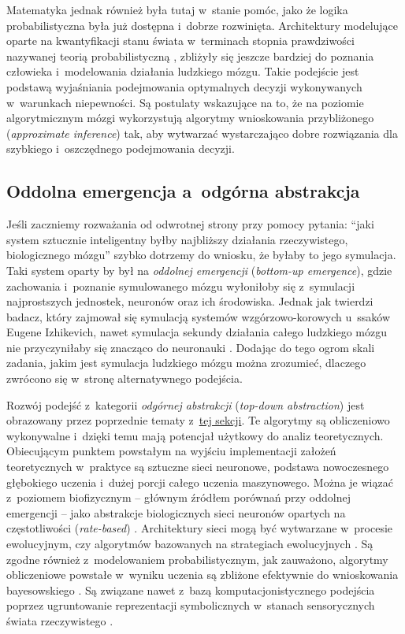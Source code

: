 Matematyka jednak również była tutaj w~stanie pomóc, jako że logika probabilistyczna była już dostępna i~dobrze rozwinięta.
Architektury modelujące oparte na kwantyfikacji stanu świata w~terminach stopnia prawdziwości nazywanej teorią probabilistyczną \cite{jaynes1988does}, zbliżyły się jeszcze bardziej do poznania człowieka i~modelowania działania ludzkiego mózgu.
Takie podejście jest podstawą wyjaśniania podejmowania optymalnych decyzji wykonywanych w~warunkach niepewności.
Są postulaty wskazujące na to, że na poziomie algorytmicznym mózgi wykorzystują algorytmy wnioskowania przybliżonego (\emph{approximate inference}) \cite{andrieu2003introduction} tak, aby wytwarzać wystarczająco dobre rozwiązania dla szybkiego i~oszczędnego podejmowania decyzji.

\subsection{Oddolna emergencja a~odgórna abstrakcja}

Jeśli zaczniemy rozważania od odwrotnej strony przy pomocy pytania: ``jaki system sztucznie inteligentny byłby najbliższy działania rzeczywistego, biologicznego mózgu'' szybko dotrzemy do wniosku, że byłaby to jego symulacja.
Taki system oparty by był na \emph{oddolnej emergencji} (\emph{bottom-up emergence}), gdzie zachowania i~poznanie symulowanego mózgu wyłoniłoby się z~symulacji najprostszych jednostek, neuronów oraz ich środowiska.
Jednak jak twierdzi badacz, który zajmował się symulacją systemów wzgórzowo-korowych u~ssaków \cite{izhikevich2008large} Eugene Izhikevich, nawet symulacja sekundy działania całego ludzkiego mózgu nie przyczyniłaby się znacząco do neuronauki \cite{Izhikevich2006why}.
Dodając do tego ogrom skali zadania, jakim jest symulacja ludzkiego mózgu można zrozumieć, dlaczego zwrócono się w~stronę alternatywnego podejścia.

Rozwój podejść z~kategorii \emph{odgórnej abstrakcji} (\emph{top-down abstraction}) jest obrazowany przez poprzednie tematy z~\hyperref[cognitive-basics]{tej sekcji}.
Te algorytmy są obliczeniowo wykonywalne i~dzięki temu mają potencjał użytkowy do analiz teoretycznych.
Obiecującym punktem powstałym na wyjściu implementacji założeń teoretycznych w~praktyce są sztuczne sieci neuronowe, podstawa nowoczesnego głębokiego uczenia i~dużej porcji całego uczenia maszynowego.
Można je wiązać z~poziomem biofizycznym -- głównym źródłem porównań przy oddolnej emergencji -- jako abstrakcje biologicznych sieci neuronów opartych na częstotliwości (\emph{rate-based}) \cite{dayan2001theoretical}.
Architektury sieci mogą być wytwarzane w~procesie ewolucyjnym, czy algorytmów bazowanych na strategiach ewolucyjnych \cite{real2017large}.
Są zgodne również z~modelowaniem probabilistycznym, jak zauważono, algorytmy obliczeniowe powstałe w~wyniku uczenia są zbliżone efektywnie do wnioskowania bayesowskiego \cite{gal2016dropout, mandt2017stochastic}.
Są związane nawet z~bazą komputacjonistycznego podejścia poprzez ugruntowanie reprezentacji symbolicznych w~stanach sensorycznych świata rzeczywistego \cite{harnad1990symbol}.

